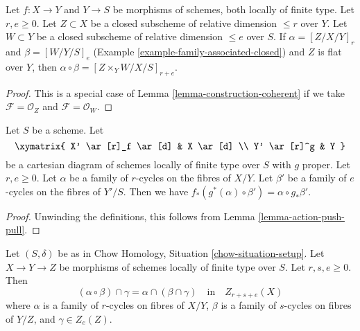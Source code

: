\begin{lemma}
\label{lemma-construction-closed}
Let $f : X \to Y$ and $Y \to S$ be morphisms of schemes, both locally of
finite type. Let $r, e \geq 0$. Let $Z \subset X$ be a closed
subscheme of relative dimension $\leq r$ over $Y$.
Let $W \subset Y$ be a closed subscheme of relative dimension $\leq e$
over $S$. If $\alpha = [Z/X/Y]_r$ and $\beta = [W/Y/S]_e$
(Example \ref{example-family-associated-closed}) and $Z$ is flat over $Y$,
then $\alpha \circ \beta = [Z \times_Y W/X/S]_{r + e}$.
\end{lemma}

\begin{proof}
This is a special case of Lemma \ref{lemma-construction-coherent}
if we take $\mathcal{F} = \mathcal{O}_Z$ and $\mathcal{F} = \mathcal{O}_W$.
\end{proof}

\begin{lemma}
\label{lemma-construction-push-pull}
Let $S$ be a scheme. Let
$$
\xymatrix{
X' \ar[r]_f \ar[d] & X \ar[d] \\
Y' \ar[r]^g & Y
}
$$
be a cartesian diagram of schemes locally of finite type over $S$
with $g$ proper. Let $r, e \geq 0$. Let $\alpha$ be a family of
$r$-cycles on the fibres of $X/Y$. Let $\beta'$ be a family of
$e$-cycles on the fibres of $Y'/S$. Then we have
$f_*(g^*(\alpha) \circ \beta') = \alpha \circ g_*\beta'$.
\end{lemma}

\begin{proof}
Unwinding the definitions, this follows from
Lemma \ref{lemma-action-push-pull}.
\end{proof}

\begin{lemma}
\label{lemma-construction-composition}
Let $(S, \delta)$ be as in Chow Homology, Situation \ref{chow-situation-setup}.
Let $X \to Y \to Z$ be morphisms of schemes locally of finite type over $S$.
Let $r, s, e \geq 0$. Then
$$
(\alpha \circ \beta) \cap \gamma = \alpha \cap (\beta \cap \gamma)
\quad\text{in}\quad Z_{r + s + e}(X)
$$
where $\alpha$ is a family of $r$-cycles on fibres of $X/Y$,
$\beta$ is a family of $s$-cycles on fibres of $Y/Z$, and $\gamma \in Z_e(Z)$.
\end{lemma}

